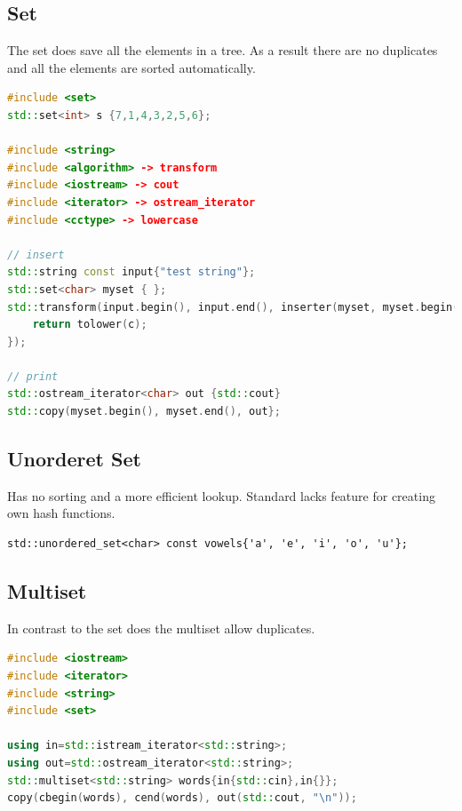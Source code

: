 \subsection{Set}
The set does save all the elements in a tree. As a result there are no duplicates and all the elements are sorted automatically.
\begin{lstlisting}[language=C++]
#include <set>
std::set<int> s {7,1,4,3,2,5,6};

#include <string>
#include <algorithm> -> transform
#include <iostream> -> cout
#include <iterator> -> ostream_iterator
#include <cctype> -> lowercase

// insert
std::string const input{"test string"};
std::set<char> myset { };
std::transform(input.begin(), input.end(), inserter(myset, myset.begin()), [](char c) {
	return tolower(c);
});

// print
std::ostream_iterator<char> out {std::cout}
std::copy(myset.begin(), myset.end(), out};
\end{lstlisting}

\subsection{Unorderet Set}
Has no sorting and a more efficient lookup. Standard lacks feature for creating own hash functions.

\begin{lstlisting}
std::unordered_set<char> const vowels{'a', 'e', 'i', 'o', 'u'};
\end{lstlisting}

\subsection{Multiset}
In contrast to the set does the multiset allow duplicates.
\begin{lstlisting}[language=C++]
#include <iostream>
#include <iterator>
#include <string>
#include <set>

using in=std::istream_iterator<std::string>;
using out=std::ostream_iterator<std::string>;
std::multiset<std::string> words{in{std::cin},in{}};
copy(cbegin(words), cend(words), out(std::cout, "\n"));
\end{lstlisting}

